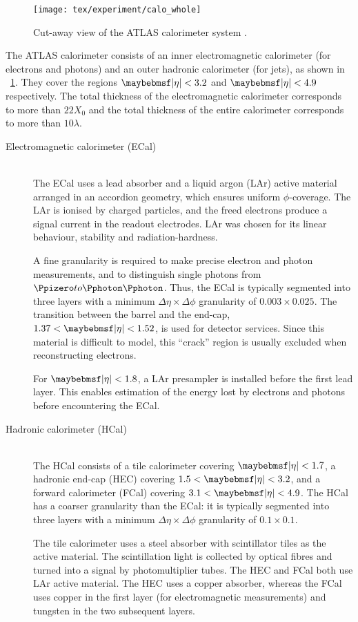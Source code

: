 \begin{figure}[t]
	\texttt{[image: tex/experiment/calo\_whole]}
	\caption{Cut-away view of the ATLAS calorimeter system \cite{ATLAS-detector}.}
	\label{fig:calorimeters}
\end{figure}

The ATLAS calorimeter consists of an inner electromagnetic calorimeter (for electrons and 
photons) and an outer hadronic calorimeter (for jets), as shown in 
\Figure~\ref{fig:calorimeters}. They cover the regions $\mods{\eta} < 3.2$ and 
$\mods{\eta} < 4.9$ respectively. The total thickness of the electromagnetic calorimeter 
corresponds to more than $22 X_0$ and the total thickness of the entire calorimeter 
corresponds to more than $10 \lambda$.
\begin{description}
\item[Electromagnetic calorimeter (ECal)] \hfill \\
	The ECal uses a lead absorber and a liquid argon (LAr) active material arranged 
	in an accordion geometry, which ensures uniform $\phi$-coverage. The LAr is ionised 
	by charged particles, and the freed electrons produce a signal current in the readout 
	electrodes. LAr was chosen for its linear behaviour, stability and radiation-hardness.

	A fine granularity is required to make precise electron and photon measurements, and 
	to distinguish single photons from $\HepProcess{\Ppizero \HepTo \Pphoton \Pphoton}$. 
	Thus, the ECal is typically segmented into three layers with a minimum 
	$\Delta\eta\times\Delta\phi$ granularity of $0.003 \times 0.025$. The transition 
	between the barrel and the end-cap, $1.37 < \mods{\eta} < 1.52$, is used for detector 
	services. Since this material is difficult to model, this ``crack'' region is usually 
	excluded when reconstructing electrons.

	For $\mods{\eta} < 1.8$, a LAr presampler is installed before the first lead layer. 
	This enables estimation of the energy lost by electrons and photons before 
	encountering the ECal.
\item[Hadronic calorimeter (HCal)] \hfill \\
	The HCal consists of a tile calorimeter covering $\mods{\eta} < 1.7$, a hadronic 
	end-cap (HEC) covering $1.5 < \mods{\eta} < 3.2$, and a forward calorimeter (FCal) 
	covering $3.1 < \mods{\eta} < 4.9$. The HCal has a coarser granularity than the
	ECal: it is typically segmented into three layers with a minimum 
	$\Delta\eta\times\Delta\phi$ granularity of $0.1 \times 0.1$.

	The tile calorimeter uses a steel absorber with scintillator tiles as the active 
	material. The scintillation light is collected by optical fibres and turned into a 
	signal by photomultiplier tubes. The HEC and FCal both use LAr active material.
	The HEC uses a copper absorber, whereas the FCal uses copper in the first layer (for 
	electromagnetic measurements) and tungsten in the two subsequent layers.
\end{description}



